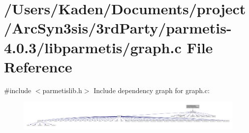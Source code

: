 \hypertarget{a00852}{}\section{/\+Users/\+Kaden/\+Documents/project/\+Arc\+Syn3sis/3rd\+Party/parmetis-\/4.0.3/libparmetis/graph.c File Reference}
\label{a00852}
{\ttfamily \#include $<$parmetislib.\+h$>$}\newline
Include dependency graph for graph.\+c\+:\nopagebreak
\begin{figure}[H]
\begin{center}
\leavevmode
\includegraphics[width=350pt]{a00853}
\end{center}
\end{figure}

